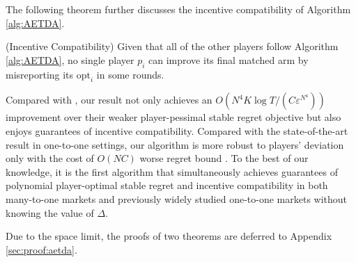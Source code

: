 The following theorem further discusses the incentive compatibility of Algorithm \ref{alg:AETDA}. 

\begin{theorem}{(Incentive  Compatibility)}\label{thm:aetgs:strategic}
Given that all of the other players follow Algorithm \ref{alg:AETDA}, no single player $p_i$ can improve its final matched arm by misreporting its $\mathrm{opt}_i$ in some rounds.  
\end{theorem}


Compared with \citet{wang2022bandit}, our result not only achieves 
an $O(N^4K\log T/(C\varepsilon^{N^4}))$ improvement over their weaker player-pessimal stable regret objective but also enjoys guarantees of incentive compatibility. 
Compared with the state-of-the-art result in one-to-one settings, our algorithm is more robust to players' deviation only with the cost of $O(NC)$ worse regret bound \citep{zhang2022matching,kong2023player}. 
To the best of our knowledge, it is the first algorithm that simultaneously achieves guarantees of polynomial player-optimal stable regret and incentive compatibility in both many-to-one markets and previously widely studied one-to-one markets without knowing the value of $\Delta$. 

Due to the space limit, the proofs of two theorems are deferred to Appendix \ref{sec:proof:aetda}. 





